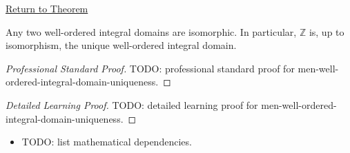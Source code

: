 \newpage
{}
\label{prf:men-well-ordered-integral-domain-uniqueness}

\begin{remark*}[Return]
\hyperref[thm:men-well-ordered-integral-domain-uniqueness]{Return to Theorem}
\end{remark*}

\begin{theorem*}
Any two well-ordered integral domains are isomorphic.
In particular, $\mathbb{Z}$ is, up to isomorphism, the unique
well-ordered integral domain.
\end{theorem*}

\begin{proof}[Professional Standard Proof]
\LRAProofBodyStart
TODO: professional standard proof for men-well-ordered-integral-domain-uniqueness.
\end{proof}

\begin{proof}[Detailed Learning Proof]
\LRAProofBodyStart
TODO: detailed learning proof for men-well-ordered-integral-domain-uniqueness.
\end{proof}

\begin{remark*}
\end{remark*}

\begin{dependencies}
\begin{itemize}
  \item TODO: list mathematical dependencies.
\end{itemize}
\end{dependencies}

\clearpage
